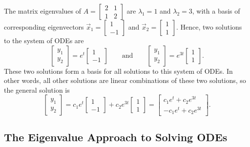 \begin{example}
The matrix eigenvalues of $A=\begin{bmatrix}2&1\\1&2\end{bmatrix}$ are $\lambda_1 = 1$ and $\lambda_2= 3$, with a basis of corresponding eigenvectors $\vec x_1=\begin{bmatrix}1\\-1\end{bmatrix}$ and $\vec x_2=\begin{bmatrix}1\\1\end{bmatrix}$. Hence, two solutions to the system of ODEs are 
$$ \begin{bmatrix}y_1\\y_2\end{bmatrix} = e^t\begin{bmatrix}1\\-1\end{bmatrix}\quad\quad \text{and} \quad\quad \begin{bmatrix}y_1\\y_2\end{bmatrix} = e^{3t}\begin{bmatrix}1\\1\end{bmatrix}.$$ 
These two solutions form a basis for all solutions to this system of ODEs. 
In other words, all other solutions are linear combinations of these two solutions, so the general solution is 
$$ \begin{bmatrix}y_1\\y_2\end{bmatrix} 
= c_1 e^t\begin{bmatrix}1\\-1\end{bmatrix} 
+ c_2 e^{3t}\begin{bmatrix}1\\1\end{bmatrix}
=
\begin{bmatrix}c_1e^t + c_2e^{3t}\\-c_1e^t + c_2e^{3t}\end{bmatrix}.$$ 
\end{example}


\subsection{The Eigenvalue Approach to Solving ODEs}

